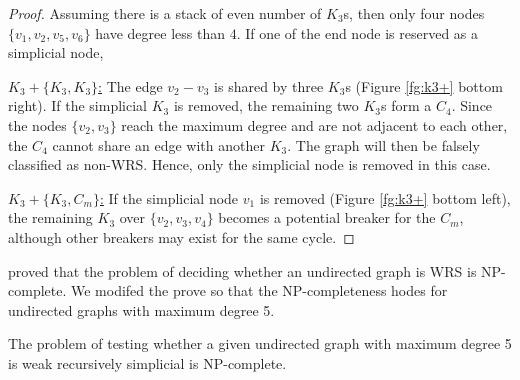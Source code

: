\begin{proof}
Assuming there is a stack of even number of $K_3$s, then only four nodes $\{v_1,v_2,v_5,v_6\}$ have degree less than $4$. If one of the end node is reserved as a simplicial node, 
\begin{figure}[H]
\centering
{}
\end{figure}



\underline{$K_3+\{K_3,K_3\}$:} The edge $v_2-v_3$ is shared by three $K_3$s (Figure \ref{fg:k3+} bottom right). If the simplicial $K_3$ is removed, the remaining two $K_3$s form a $C_4$. Since the nodes $\{v_2,v_3\}$ reach the maximum degree and are not adjacent to each other, the $C_4$ cannot share an edge with another $K_3$. The graph will then be falsely classified as non-WRS. Hence, only the simplicial node is removed in this case.  

\underline{$K_3+\{K_3,C_m\}$:} If the simplicial node $v_1$ is removed (Figure \ref{fg:k3+} bottom left), the remaining $K_3$ over $\{v_2,v_3,v_4\}$ becomes a potential breaker for the $C_m$, although other breakers may exist for the same cycle. 
\end{proof}



\cite{verma1993deciding} proved that the problem of deciding whether an undirected graph is WRS is NP-complete. We modifed the prove so that the NP-completeness hodes for undirected graphs with maximum degree 5. 
\begin{proposition}
The problem of testing whether a given undirected graph with maximum degree 5 is weak recursively simplicial is NP-complete. 
\end{proposition}

